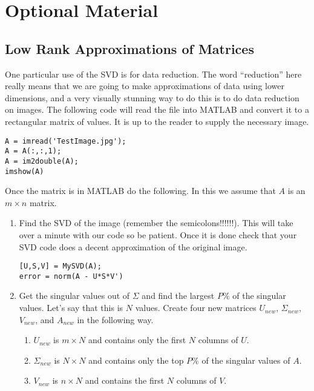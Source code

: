 \chapter{Optional Material}

\newpage\section{Low Rank Approximations of Matrices}

\begin{problem}
    One particular use of the SVD is for data reduction.  The word ``reduction'' here
    really means that we are going to make approximations of data using lower dimensions,
    and a very visually stunning way to do this is to do data reduction on images.  The following code will read
    the file  into MATLAB and convert it to a rectangular matrix of
    values.  It is up to the reader to supply the necessary image.
\begin{lstlisting}
A = imread('TestImage.jpg');
A = A(:,:,1);
A = im2double(A);
imshow(A)
\end{lstlisting}
    Once the matrix is in MATLAB do the following.  In this we assume that $A$ is an $m
    \times n$ matrix.
    \begin{enumerate}
        \item Find the SVD of the image (remember the semicolons!!!!!!).  This will take
            over a minute with our code so be patient.  Once it is done check that your
            SVD code does a decent approximation of the original image.
\begin{lstlisting}
[U,S,V] = MySVD(A);
error = norm(A - U*S*V')
\end{lstlisting}
        \item Get the singular values out of $\Sigma$ and find the largest $P$\% of the
            singular values. Let's say that this is $N$ values.  Create four new matrices
            $U_{new}$, $\Sigma_{new}$, $V_{new}$, and $A_{new}$ in the following way.
            \begin{enumerate}
                \item $U_{new}$ is $m \times N$ and contains only the first $N$ columns of
                    $U$.
                \item $\Sigma_{new}$ is $N \times N$ and contains only the top $P$\% of
                    the singular values of $A$.
                \item $V_{new}$ is $n \times N$ and contains the first $N$ columns of $V$.

\end{enumerate}
\end{enumerate}
\end{problem}
